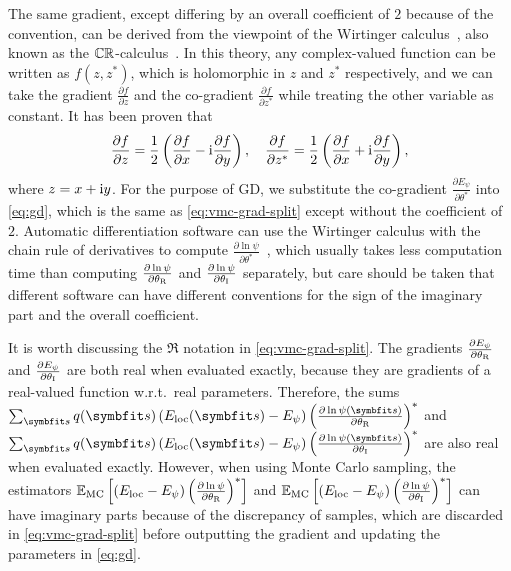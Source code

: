 The same gradient, except differing by an overall coefficient of $2$ because of the convention, can be derived from the viewpoint of the Wirtinger calculus~\cite{wirtinger1927formalen}, also known as the $\mathbb{C} \mathbb{R}$-calculus~\cite{kreutz2009complex}. In this theory, any complex-valued function can be written as $f(z, z^*)$, which is holomorphic in $z$ and $z^*$ respectively, and we can take the gradient $\frac{\partial f}{\partial z}$ and the co-gradient $\frac{\partial f}{\partial z^*}$ while treating the other variable as constant. It has been proven that
\begin{equation}
\frac{\partial f}{\partial z} = \frac{1}{2} \left( \frac{\partial f}{\partial x} - \mathrm{i} \frac{\partial f}{\partial y} \right), \quad
\frac{\partial f}{\partial z^*} = \frac{1}{2} \left( \frac{\partial f}{\partial x} + \mathrm{i} \frac{\partial f}{\partial y} \right),
\end{equation}
where $z = x + \mathrm{i} y$. For the purpose of GD, we substitute the co-gradient $\frac{\partial E_\psi}{\partial \theta^*}$ into \cref{eq:gd}, which is the same as \cref{eq:vmc-grad-split} except without the coefficient of $2$. Automatic differentiation software can use the Wirtinger calculus with the chain rule of derivatives to compute $\frac{\partial \ln \psi}{\partial \theta^*}$~\cite{kramer2024tutorial}, which usually takes less computation time than computing $\frac{\partial \ln \psi}{\partial {\theta_\text{R}}}$ and $\frac{\partial \ln \psi}{\partial {\theta_\text{I}}}$ separately, but care should be taken that different software can have different conventions for the sign of the imaginary part and the overall coefficient.

It is worth discussing the $\Re$ notation in \cref{eq:vmc-grad-split}. The gradients $\frac{\partial E_\psi}{\partial {\theta_\text{R}}}$ and $\frac{\partial E_\psi}{\partial {\theta_\text{I}}}$ are both real when evaluated exactly, because they are gradients of a real-valued function w.r.t.\ real parameters. Therefore, the sums $\sum_\vs q(\vs) \left( E_\text{loc}(\vs) - E_\psi \right) \left( \frac{\partial \ln \psi(\vs)}{\partial \thetar} \right)^*$ and $\sum_\vs q(\vs) \left( E_\text{loc}(\vs) - E_\psi \right) \left( \frac{\partial \ln \psi(\vs)}{\partial \thetai} \right)^*$ are also real when evaluated exactly. However, when using Monte Carlo sampling, the estimators $\mathbb{E}_\text{MC}\left[ \left( E_\text{loc} - E_\psi \right) \left( \frac{\partial \ln \psi}{\partial {\theta_\text{R}}} \right)^* \right]$ and $\mathbb{E}_\text{MC}\left[ \left( E_\text{loc} - E_\psi \right) \left( \frac{\partial \ln \psi}{\partial {\theta_\text{I}}} \right)^* \right]$ can have imaginary parts because of the discrepancy of samples, which are discarded in \cref{eq:vmc-grad-split} before outputting the gradient and updating the parameters in \cref{eq:gd}.

